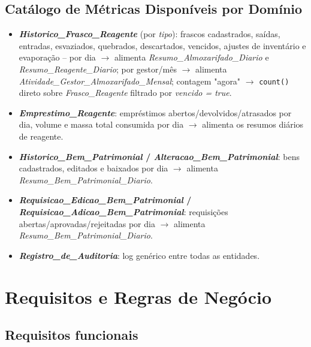 \documentclass[12pt,a4paper]{article}
\begin{document}
\subsection{Catálogo de Métricas Disponíveis por Domínio}
\begin{itemize}
    \item \textbf{\textit{Historico\_Frasco\_Reagente}} (por \textit{tipo}): frascos cadastrados, saídas, entradas, esvaziados, quebrados, descartados, vencidos, ajustes de inventário e evaporação -- por dia $\rightarrow$ alimenta \textit{Resumo\_Almoxarifado\_Diario} e \textit{Resumo\_Reagente\_Diario}; por gestor/mês $\rightarrow$ alimenta \textit{Atividade\_Gestor\_Almoxarifado\_Mensal}; contagem "agora" $\rightarrow$ \texttt{count()} direto sobre \textit{Frasco\_Reagente} filtrado por \textit{vencido = true}.
    \item \textbf{\textit{Emprestimo\_Reagente}}: empréstimos abertos/devolvidos/atrasados por dia, volume e massa total consumida por dia $\rightarrow$ alimenta os resumos diários de reagente.
    \item \textbf{\textit{Historico\_Bem\_Patrimonial} / \textit{Alteracao\_Bem\_Patrimonial}}: bens cadastrados, editados e baixados por dia $\rightarrow$ alimenta \textit{Resumo\_Bem\_Patrimonial\_Diario}.
    \item \textbf{\textit{Requisicao\_Edicao\_Bem\_Patrimonial} / \textit{Requisicao\_Adicao\_Bem\_Patrimonial}}: requisições abertas/aprovadas/rejeitadas por dia $\rightarrow$ alimenta \textit{Resumo\_Bem\_Patrimonial\_Diario}.
    \item \textbf{\textit{Registro\_de\_Auditoria}}: log genérico entre todas as entidades.
\end{itemize}

\section{Requisitos e Regras de Negócio}

\subsection{Requisitos funcionais}
\end{document}
